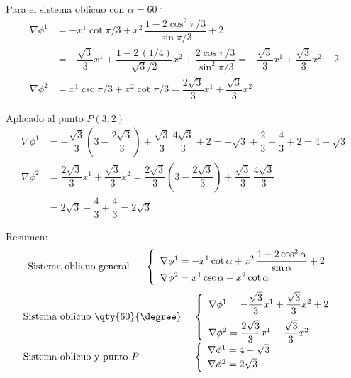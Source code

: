 Para el sistema oblicuo con $\alpha= \qty{60}{\degree}$
\begin{align*}
  \nabla\phi^1
  &=
    -x^1 \cot{\pi/3}
    + x^2\,\dfrac{1-2\cos^2\pi/3}{\sin\pi/3}
    + 2\\
  &=
    -\dfrac{\sqrt{3}}{3}x^1
    +  \dfrac{1-2\,(1/4)}{\sqrt{3}/2} x^2
    + \dfrac{2\cos\pi/3}{\sin^2\pi/3}
    = -\dfrac{\sqrt{3}}{3}x^1
    + \dfrac{\sqrt{3}}{3}x^2
    + 2\\
  \nabla\phi^2
  &=
    x^1 \csc\pi/3
    + x^2 \cot\pi/3
    = \dfrac{2\sqrt{3}}{3} x^1 + \dfrac{\sqrt{3}}{3} x^2
\end{align*}

Aplicado al punto $P(3,2)$
\begin{align*}
  \nabla\phi^1
  &=
    -\dfrac{\sqrt{3}}{3}\left(%
    3-\dfrac{2\sqrt{3}}{3}
    \right)
    + \dfrac{\sqrt{3}}{3}\, \dfrac{4\sqrt{3}}{3}
    + 2
    = -\sqrt{3} + \dfrac{2}{3} + \dfrac{4}{3} + 2
    = 4 - \sqrt{3}\\
  \nabla\phi^2
  &=
    \dfrac{2\sqrt{3}}{3} x^1 + \dfrac{\sqrt{3}}{3} x^2
    = \dfrac{2\sqrt{3}}{3} \left(3-\dfrac{2\sqrt{3}}{3}\right)
    + \dfrac{\sqrt{3}}{3}\,\dfrac{4\sqrt{3}}{3}\\
  &=
    2\sqrt{3}
    - \dfrac{4}{3}
    + \dfrac{4}{3}
    = 2\sqrt{3}
\end{align*}

\noindent
Resumen:
\[
  \text{Sistema oblicuo general }
  \hspace{1.2em}
  \begin{cases}
    \begin{array}{l}
      \nabla\phi^1 = -x^1\cot\alpha
      + x^2\,\dfrac{1-2\cos^2\alpha}{\sin\alpha}
      + 2\\
      \nabla\phi^2 = x^1\csc\alpha + x^2 \cot\alpha
    \end{array}
  \end{cases}
\]
\[
  \begin{array}{ll}
    \text{Sistema oblicuo \qty{60}{\degree} } &
    \begin{cases}
      \begin{array}{l}
        \nabla\phi^1 = -\dfrac{\sqrt{3}}{3} x^1 + \dfrac{\sqrt{3}}{3} x^2 + 2\\[2ex]
        \nabla\phi^2 =\dfrac{2\sqrt{3}}{3} x^1 + \dfrac{\sqrt{3}}{3} x^2
      \end{array}
    \end{cases}\\[2ex]
    \text{Sistema oblicuo y punto } P &
    \begin{cases}
      \begin{array}{l}
        \nabla\phi^1 = 4 - \sqrt{3}\\
        \nabla\phi^2 = 2\sqrt{3}
      \end{array}
    \end{cases}
  \end{array}
\]

